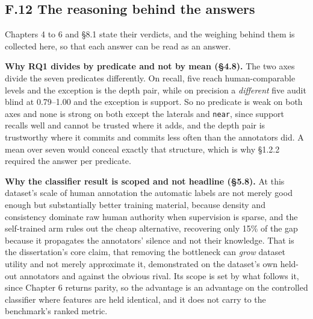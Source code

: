 \subsection{F.12 The reasoning behind the answers}

Chapters 4 to 6 and \S{}8.1 state their verdicts, and the weighing behind them is collected here, so that each answer can be read as an answer.

\textbf{Why RQ1 divides by predicate and not by mean (\S{}4.8).} The two axes divide the seven predicates differently. On recall, five reach human-comparable levels and the exception is the depth pair, while on precision a \textit{different} five audit blind at 0.79--1.00 and the exception is support. So no predicate is weak on both axes and none is strong on both except the laterals and \texttt{near}, since support recalls well and cannot be trusted where it adds, and the depth pair is trustworthy where it commits and commits less often than the annotators did. A mean over seven would conceal exactly that structure, which is why \S{}1.2.2 required the answer per predicate.

\textbf{Why the classifier result is scoped and not headline (\S{}5.8).} At this dataset's scale of human annotation the automatic labels are not merely good enough but substantially better training material, because density and consistency dominate raw human authority when supervision is sparse, and the self-trained arm rules out the cheap alternative, recovering only 15\% of the gap because it propagates the annotators' silence and not their knowledge. That is the dissertation's core claim, that removing the bottleneck can \textit{grow} dataset utility and not merely approximate it, demonstrated on the dataset's own held-out annotators and against the obvious rival. Its scope is set by what follows it, since Chapter 6 returns parity, so the advantage is an advantage on the controlled classifier where features are held identical, and it does not carry to the benchmark's ranked metric.


